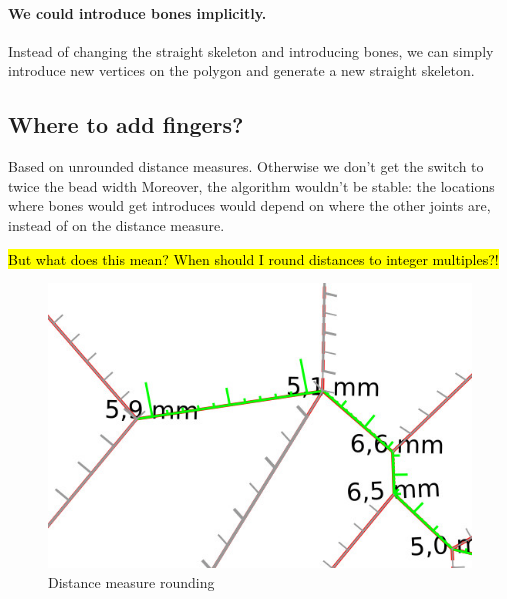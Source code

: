 \paragraph{We could introduce bones implicitly.}
Instead of changing the straight skeleton and introducing bones,
we can simply introduce new vertices on the polygon and generate a new straight skeleton.



\subsection{Where to add fingers?}
Based on unrounded distance measures.
Otherwise we don’t get the switch to twice the bead width
Moreover, the algorithm wouldn’t be stable: the locations where bones would get introduces would depend on where the other joints are, instead of on the distance measure.

\hl{But what does this mean?
When should I round distances to integer multiples?!}

\begin{figure}
\includegraphics[width=\columnwidth]{sources/method/rounded_dist_measures.jpg}
\caption{Distance measure rounding}
\label{rounded_dist_measures}
\end{figure}


























